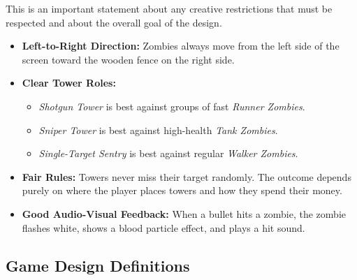 \begin{guidance}
This is an important statement about any creative restrictions that must be respected and about the overall goal of the design.
\end{guidance}
\begin{itemize}[label=\textbullet]
  \item \textbf{Left-to-Right Direction:} Zombies always move from the left side of the screen toward the wooden fence on the right side.
  \item \textbf{Clear Tower Roles:}
    \begin{itemize}[label=$\circ$]
      \item \textit{Shotgun Tower} is best against groups of fast \textit{Runner Zombies}.
      \item \textit{Sniper Tower} is best against high-health \textit{Tank Zombies}.
      \item \textit{Single-Target Sentry} is best against regular \textit{Walker Zombies}.
    \end{itemize}
  \item \textbf{Fair Rules:} Towers never miss their target randomly. The outcome depends purely on where the player places towers and how they spend their money.
  \item \textbf{Good Audio-Visual Feedback:} When a bullet hits a zombie, the zombie flashes white, shows a blood particle effect, and plays a hit sound.
\end{itemize}

\subsection{Game Design Definitions}

